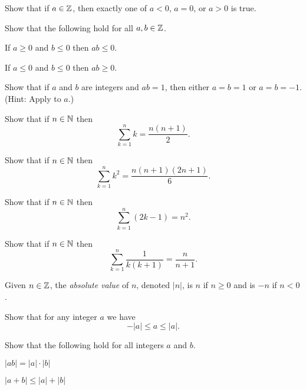 \begin{exercise}[Trichotomy.]\label{exerc:trichotomy}
Show that if \(a \in \mathbb{Z}\), then exactly one of \(a < 0\), \(a = 0\), or \(a > 0\) is true.
\end{exercise}

\begin{exercise}
Show that the following hold for all \(a,b \in \mathbb{Z}\).
\begin{proplist*}
\item If \(a \geq 0\) and \(b \leq 0\) then \(ab \leq 0\).
\item If \(a \leq 0\) and \(b \leq 0\) then \(ab \geq 0\).
\end{proplist*}
\end{exercise}

\begin{exercise}
Show that if \(a\) and \(b\) are integers and \(ab = 1\), then either \(a = b = 1\) or \(a = b = -1\).
(Hint: Apply  to \(a\).)
\end{exercise}

\begin{exercise}
Show that if \(n \in \mathbb{N}\) then \[ \sum_{k=1}^n k = \frac{n(n+1)}{2}. \]
\end{exercise}

\begin{exercise}
Show that if \(n \in \mathbb{N}\) then \[ \sum_{k=1}^n k^2 = \frac{n(n+1)(2n+1)}{6}. \]
\end{exercise}

\begin{exercise}
Show that if \(n \in \mathbb{N}\) then \[ \sum_{k=1}^n (2k - 1) = n^2. \]
\end{exercise}

\begin{exercise}
Show that if \(n \in \mathbb{N}\) then \[ \sum_{k=1}^n \frac{1}{k(k+1)} = \frac{n}{n+1}. \]
\end{exercise}

\begin{dfn}
Given \(n \in \mathbb{Z}\), the \emph{absolute value} of \(n\), denoted \(|n|\), is \(n\) if \(n \geq 0\) and is \(-n\) if \(n < 0\).
\end{dfn}

\begin{exercise}
Show that for any integer \(a\) we have \[ -|a| \leq a \leq |a|. \]
\end{exercise}

\begin{exercise}
Show that the following hold for all integers \(a\) and \(b\).
\begin{proplist}
\item \(|ab| = |a| \cdot |b|\)
\item \(|a+b| \leq |a| + |b|\)
\end{proplist}
\end{exercise}

